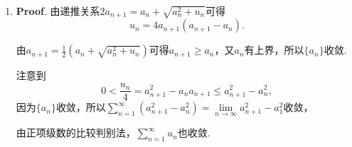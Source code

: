 \documentclass[../main.tex]{subfiles}
\begin{document}
\begin{enumerate}
  \item \textbf{Proof}. 由递推关系$2a_{n+1} = a_n + \sqrt{a_n^2 + u_n}$可得
        \[
          u_n=4a_{n+1}\left(a_{n+1}-a_n\right).
        \]

        由$a_{n+1}=\frac{1}{2}\left(a_n+\sqrt{a_n^2+u_n}\right)$可得$a_{n+1}\geq a_n$，又$a_n$有上界，所以$\{a_n\}$收敛.

        注意到
        \[
          0<\frac{u_n}{4}=a_{n+1}^2-a_na_{n+1}\leq a_{n+1}^2-a_n^2,
        \]
        因为$\{a_n\}$收敛，所以$\sum\limits_{n=1}^{\infty} (a_{n+1}^2 - a_n^2)=\lim\limits_{n\to\infty} a_{n+1}^2 - a_1^2$收敛，

        由正项级数的比较判别法，$\sum\limits_{n=1}^{\infty} u_n$也收敛.

\end{enumerate}
\end{document}
